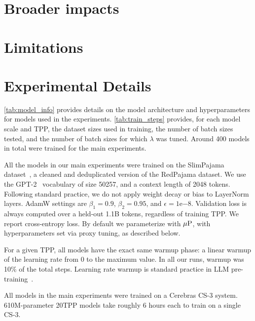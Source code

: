 \section{Broader impacts}\label{sec:broader}


\section{Limitations}\label{sec:limitations}


\section{Experimental Details}\label{sec:experimental_details}





\cref{tab:model_info} provides details on the model architecture and
hyperparameters for models used in the experiments.
\cref{tab:train_steps} provides, for each model scale and TPP, the
dataset sizes used in training, the number of batch sizes tested, and
the number of batch sizes for which $\lambda$ was tuned.
%
Around 400 models in total were trained for the main experiments.

All the models in our main experiments were trained on the SlimPajama
dataset~\citep{cerebras2023slimpajama}, a cleaned and deduplicated
version of the RedPajama dataset.  We use the
GPT-2~\citep{radford2019gpt2} vocabulary of size 50257, and a context
length of 2048 tokens.
%
Following standard practice, we do not apply weight decay or bias to
LayerNorm layers.
%
AdamW settings are $\beta_1 = 0.9$, $\beta_2 = 0.95$, and $\epsilon = 1$e$-8$.
%
Validation loss is always computed over a held-out 1.1B tokens,
regardless of training TPP\@.  We report cross-entropy loss.
%
By default we parameterize with $\mbox{$\mu$P}$, with hyperparameters set via
proxy tuning, as described below.

For a given TPP, all models have the exact same warmup phase: a linear
warmup of the learning rate from 0 to the maximum value.
%
In all our runs, warmup was 10\% of the total steps.
%
Learning rate warmup is standard practice in LLM
pre-training~\citep{brown2020language,rae2022scaling,biderman2023pythia,dubey2024llama,kosson2024analyzing}.

All models in the main experiments were trained on a Cerebras CS-3
system.  610M-parameter 20TPP models take roughly 6 hours each to
train on a single CS-3.

